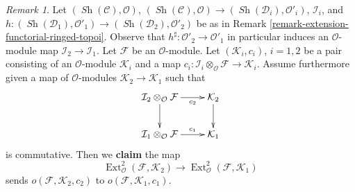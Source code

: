 \documentclass{stacks-project}
\theoremstyle{plain}
\theoremstyle{definition}
\theoremstyle{remark}
\newtheorem{remark}[subsection]{Remark}
\numberwithin{equation}{subsection}
\def\Ext{\mathop{\mathrm{Ext}}\nolimits}
\def\Sh{\mathop{\mathit{Sh}}\nolimits}
\begin{document}
\begin{remark}
\label{remark-obstruction-extension-functorial-ringed-topoi}
Let $(\Sh(\mathcal{C}), \mathcal{O})$,
$(\Sh(\mathcal{C}), \mathcal{O}) \to (\Sh(\mathcal{D}_i), \mathcal{O}'_i)$,
$\mathcal{I}_i$, and $h : (\Sh(\mathcal{D}_1), \mathcal{O}'_1) \to
(\Sh(\mathcal{D}_2), \mathcal{O}'_2)$ be as in
Remark \ref{remark-extension-functorial-ringed-topoi}.
Observe that $h^\sharp : \mathcal{O}'_2 \to \mathcal{O}'_1$
in particular induces an $\mathcal{O}$-module map
$\mathcal{I}_2 \to \mathcal{I}_1$.
Let $\mathcal{F}$ be an $\mathcal{O}$-module.
Let $(\mathcal{K}_i, c_i)$, $i = 1, 2$ be a pair
consisting of an $\mathcal{O}$-module $\mathcal{K}_i$ and a map
$c_i : \mathcal{I}_i \otimes_\mathcal{O} \mathcal{F} \to
\mathcal{K}_i$. Assume furthermore given a map
of $\mathcal{O}$-modules $\mathcal{K}_2 \to \mathcal{K}_1$
such that
$$
\xymatrix{
\mathcal{I}_2 \otimes_\mathcal{O} \mathcal{F}
\ar[r]_-{c_2} \ar[d] &
\mathcal{K}_2 \ar[d] \\
\mathcal{I}_1 \otimes_\mathcal{O} \mathcal{F}
\ar[r]^-{c_1} &
\mathcal{K}_1
}
$$
is commutative. Then we {\bf claim} the map
$$
\Ext^2_\mathcal{O}(\mathcal{F}, \mathcal{K}_2)
\longrightarrow
\Ext^2_\mathcal{O}(\mathcal{F}, \mathcal{K}_1)
$$
sends $o(\mathcal{F}, \mathcal{K}_2, c_2)$ to
$o(\mathcal{F}, \mathcal{K}_1, c_1)$.


\end{remark}
\end{document}
